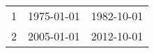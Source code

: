 % 
\begin{tabular}{ccc}
  \hline
  \hline
1 & 1975-01-01 & 1982-10-01 \\ 
  2 & 2005-01-01 & 2012-10-01 \\ 
   \hline
\end{tabular}

